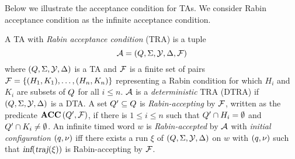 Below we illustrate the acceptance condition for TAs.
We consider Rabin acceptance condition as the infinite acceptance condition.


\vspace{-0.8em}
\begin{definition}
A TA with \emph{Rabin acceptance condition} (TRA) is a tuple
\begin{equation}\label{eq:tra}
    \mathcal{A}=(Q,\Sigma,\mathcal{Y},\Delta,\mathcal{F})
\end{equation}
where $(Q,\Sigma,\mathcal{Y},\Delta)$ is a TA and $\mathcal{F}$ is a finite
set of pairs
$
    \mathcal{F}
        = \{
            (H_1,K_1 ),
            \dots,
            (H_n,K_n)
        \}
$ representing a Rabin condition for which
$H_i$ and $K_i$ are subsets of $Q$ for all $i\le n$.
$\mathcal{A}$ is a \emph{deterministic} TRA (DTRA) if $(Q,\Sigma,\mathcal{Y},\Delta)$ is a DTA.
A set $Q' \subseteq Q $ is \emph{Rabin-accepting} by $\mathcal{F}$,
written as the predicate $\mbox{\bf ACC} \left( {Q'}, {\mathcal{F}} \right)$,
if there is $ 1 \leq i \leq n$ such that $ Q' \cap H_i= \emptyset $
and $ Q' \cap K_i \neq \emptyset $. An infinite timed word $w$ is \emph{Rabin-accepted} by
$\mathcal{A}$ with \emph{initial configuration} $(q,\nu)$ iff there exists a run $\xi$ of $(Q,\Sigma,\mathcal{Y},\Delta)$ on $w$ with $(q,\nu)$ such that
$
    \mbox{\sl inf} ( 
         \mbox{\sl traj} ( \xi )
     )
$ is Rabin-accepting by $\mathcal{F}$.
\end{definition}

%         

